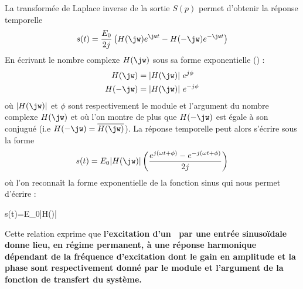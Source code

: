 La transformée de Laplace inverse de la sortie $S(p)$ permet d'obtenir la 
réponse temporelle 
\[
s(t)=\dfrac{E_0}{2j}\left(H(\jw)e^{\jw t}-H(-\jw)e^{-\jw t}\right)
\]
En écrivant le nombre complexe $H(\jw)$ sous sa forme exponentielle 
() :
\begin{align*}
    H(\jw)  &= |H(\jw)| e^{j\phi} \\
    H(-\jw) &= |H(\jw)| e^{-j\phi}
\end{align*}
où $|H(\jw)|$ et $\phi$ sont respectivement le module et l'argument du nombre
complexe $H(\jw)$ 
et où l'on montre de plus que $H(-\jw)$ est égale à son conjugué (i.e 
$H(-\jw)=\overline{H(\jw)}$).
%
%
%
%
La réponse temporelle peut alors s'écrire sous la forme 
\begin{align*}
s(t)=E_0|H(\jw)|\left(\dfrac{e^{j(\omega t+\phi)}
    -e^{-j(\omega t+\phi)}}{2j}\right)
\end{align*}
où l'on reconnaît la forme exponentielle de la fonction sinus qui nous permet
d'écrire :
\begin{bequation}
    s(t)=E_0|H(\jw)|\label{eq-rh}
\end{bequation}
Cette relation exprime que \textbf{l'excitation d'un {}
~par une entrée sinuso\"idale donne lieu, en régime permanent, à une réponse 
harmonique dépendant de la fréquence d'excitation dont le gain en amplitude et
la phase sont respectivement donné par le module et l'argument de la fonction
de transfert du système.}

